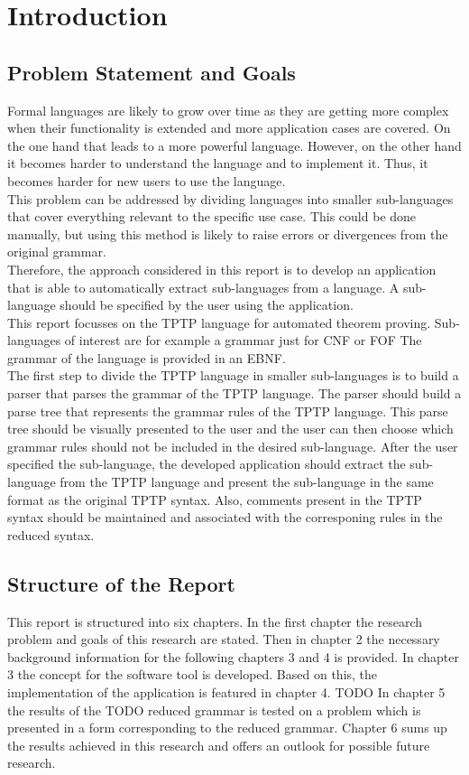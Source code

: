 
\chapter{Introduction}\label{cha:Introduction}

\section{Problem Statement and Goals}\label{sec:Aufgabenstellung}
Formal languages are likely to grow over time as they are getting more complex when their functionality is extended and more application cases are covered.
On the one hand that leads to a more powerful language.
However, on the other hand it becomes harder to understand the language and to implement it.
Thus, it becomes harder for new users to use the language.\\
This problem can be addressed by dividing languages into smaller sub-languages that cover everything relevant to the specific use case. 
This could be done manually, but using this method is likely to raise errors or divergences from the original grammar.\\
Therefore, the approach considered in this report is to develop an application that is able to automatically extract sub-languages from a language.
A sub-language should be specified by the user using the application.\\
This report focusses on the \acf{TPTP} language for automated theorem proving.
Sub-languages of interest are for example a grammar just for \ac{CNF} or \ac{FOF}
The grammar of the language is provided in an \acf{EBNF}.\\
The first step to divide the \ac{TPTP} language in smaller sub-languages is to build a parser that parses the grammar of the \ac{TPTP} language.
The parser should build a parse tree that represents the grammar rules of the \ac{TPTP} language.
This parse tree should be visually presented to the user and the user can then choose which grammar rules should not be included in the desired sub-language.
After the user specified the sub-language, the developed application should extract the sub-language from the \ac{TPTP} language and present the sub-language in the same format as the original \ac{TPTP} syntax.
Also, comments present in the \ac{TPTP} syntax should be maintained and associated with the corresponing rules in the reduced syntax.
\section{Structure of the Report}\label{sec:IntroductionStructure}
This report is structured into six chapters. In the first chapter the research problem and goals of this research are stated.
Then in chapter 2 the necessary background information for the following chapters 3 and 4 is provided.
In chapter 3 the concept for the software tool is developed.
Based on this, the implementation of the application is featured in chapter 4.
TODO In chapter 5 the results of the TODO reduced grammar is tested on a problem which is presented in a form corresponding to the reduced grammar.
Chapter 6 sums up the results achieved in this research and offers an outlook for possible future research.